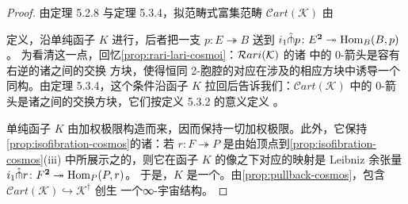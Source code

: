 \begin{proof}
由定理 5.2.8 与定理 5.3.4，拟范畴式富集范畴 $\mathcal{C}\mathit{art}(\mathcal{K})$
由\trPullback
\begin{center}
\end{center}
定义，\trPullback{}沿单纯函子 $K$ 进行，后者把一支\trIsofibration{}
$p\colon E\twoheadrightarrow B$ 送到\trIsofibration{}
$i_{1}\hat{\pitchfork}p\colon E^{\mathbf{2}}\twoheadrightarrow\mathrm{Hom}_{B}(B,p)$。
为看清这一点，回忆\cref{prop:rari-lari-cosmoi}：$\mathcal{R}ari(\mathcal{K})$ 的诸%
\trFunctorSpace{}中的 0-箭头是容有\trRightAdjoint{}右逆的诸\trIsofibration{}之间的交换
方块，使得恒同 2-胞腔的对应在涉及\trRightAdjoint{}的相应方块中诱导一个同构。由定理
5.3.4，这个条件沿函子 $K$ 拉回后告诉我们：$\mathcal{C}\mathit{art}(\mathcal{K})$
中的 0-箭头是诸\trCocartesianFibration{}之间的交换方块，它们按定义 5.3.2 的意义定义%
\trCartesianFunctor。

单纯函子 $K$ 由加权极限构造而来，因而保持一切加权极限。此外，它保持
\cref{prop:isofibration-cosmos}的诸\trIsofibration{}：若
$r\colon F\twoheadrightarrow P$ 是由始顶点到\cref{prop:isofibration-cosmos}(iii)
中所展示\trCospan{}之\trPullback{}的\trIsofibration{}，则它在函子 $K$ 的像之下对应的映射是
Leibniz 余张量 $i_{1}\hat{\pitchfork}r\colon F^{\mathbf{2}}\twoheadrightarrow\mathrm{Hom}_{P}(P,r)$。
于是，$K$ 是一个\trCosmologicalFunctor{}。由\cref{prop:pullback-cosmos}，包含
$\mathcal{C}\mathit{art}(\mathcal{K})\hookrightarrow\mathcal{K}^{\dagger}$ 创生
一个∞-宇宙结构。


\end{proof}
